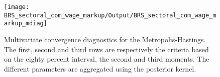  
\begin{figure}[H]
\centering 
\texttt{[image: BRS\_sectoral\_com\_wage\_markup/Output/BRS\_sectoral\_com\_wage\_markup\_mdiag]}
\caption{Multivariate convergence diagnostics for the Metropolis-Hastings.
The first, second and third rows are respectively the criteria based on
the eighty percent interval, the second and third moments. The different 
parameters are aggregated using the posterior kernel.}\label{Fig:MultivariateDiagnostics}
\end{figure}

